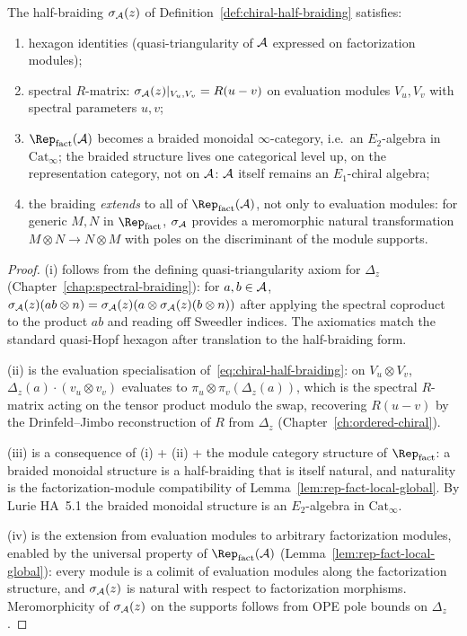 \begin{proposition}
\label{prop:half-braiding-construction}%
The half-braiding $\sigma_{\mathcal{A}}(z)$ of
Definition~\ref{def:chiral-half-braiding} satisfies:
\begin{enumerate}[label=\textup{(\roman*)}]
 \item hexagon identities (quasi-triangularity of $\mathcal{A}$ expressed
 on factorization modules);
 \item spectral $R$-matrix:
 $\sigma_{\mathcal{A}}(z)|_{V_u,V_v}=R(u-v)$ on evaluation modules
 $V_u,V_v$ with spectral parameters $u,v$;
 \item $\Rep_{\mathrm{fact}}(\cA)$ becomes a braided monoidal
 $\infty$-category, i.e.\ an $E_2$-algebra in $\mathrm{Cat}_\infty$;
 the braided structure lives one categorical level up, on the
 representation category, not on $\mathcal{A}$: $\mathcal{A}$ itself remains an
 $E_1$-chiral algebra;
 \item the braiding \emph{extends} to all of $\Rep_{\mathrm{fact}}(\cA)$,
 not only to evaluation modules: for generic $M,N$ in
 $\Rep_{\mathrm{fact}}$, $\sigma_{\mathcal{A}}$ provides a meromorphic
 natural transformation $M\otimes N\to N\otimes M$ with poles
 on the discriminant of the module supports.
\end{enumerate}
\end{proposition}

\begin{proof}
(i) follows from the defining quasi-triangularity axiom for
$\Delta_z$ (Chapter~\ref{chap:spectral-braiding}): for
$a,b\in\mathcal{A}$,
\(
 \sigma_{\mathcal{A}}(z)(ab\otimes n)=
 \sigma_{\mathcal{A}}(z)(a\otimes\sigma_{\mathcal{A}}(z)(b\otimes n))
\)
after applying the spectral coproduct to the product $ab$ and reading
off Sweedler indices. The axiomatics match the standard quasi-Hopf
hexagon after translation to the half-braiding form.

(ii) is the evaluation specialisation of~\eqref{eq:chiral-half-braiding}:
on $V_u\otimes V_v$, $\Delta_z(a)\cdot(v_u\otimes v_v)$ evaluates to
$\pi_u\otimes\pi_v(\Delta_z(a))$, which is the spectral
$R$-matrix acting on the tensor product modulo the swap, recovering
$R(u-v)$ by the Drinfeld--Jimbo reconstruction of $R$ from
$\Delta_z$ (Chapter~\ref{ch:ordered-chiral}).

(iii) is a consequence of (i) + (ii) + the module category structure
of $\Rep_{\mathrm{fact}}$: a braided monoidal structure is a
half-braiding that is itself natural, and naturality is the
factorization-module compatibility of Lemma~\ref{lem:rep-fact-local-global}.
By Lurie HA~5.1 the braided monoidal structure is an
$E_2$-algebra in $\mathrm{Cat}_\infty$.

(iv) is the extension from evaluation modules to arbitrary
factorization modules, enabled by the universal property of
$\Rep_{\mathrm{fact}}(\cA)$ (Lemma~\ref{lem:rep-fact-local-global}):
every module is a colimit of evaluation modules along the factorization
structure, and $\sigma_{\mathcal{A}}(z)$ is natural with respect to factorization
morphisms. Meromorphicity of $\sigma_{\mathcal{A}}(z)$ on the
supports follows from OPE pole bounds on $\Delta_z$.
\end{proof}

